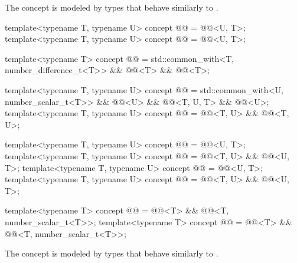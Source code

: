 \begin{itemdescr}
\pnum
\begin{note}
The  concept is modeled by types
that behave similarly to .
\end{note}
\end{itemdescr}

\begin{itemdecl}
template<typename T, typename U>
concept @@ = @@<U, T>;
template<typename T, typename U>
concept @@ = @@<U, T>;

template<typename T>
concept @@ =
  std::common_with<T, number_difference_t<T>> && @@<T> && @@<T>;

template<typename T, typename U>
concept @@ = std::common_with<U, number_scalar_t<T>> && @@<U> &&
                      @@<T, U, T> && @@<U>;
template<typename T, typename U>
concept @@ = @@<T, U> && @@<T, U>;

template<typename T, typename U>
concept @@ = @@<U, T>;
template<typename T, typename U>
concept @@ = @@<T, U> && @@<U, T>;
template<typename T, typename U>
concept @@ = @@<U, T>;
template<typename T, typename U>
concept @@ = @@<T, U> && @@<U, T>;

template<typename T>
concept @@ = @@<T> && @@<T, number_scalar_t<T>>;
template<typename T>
concept @@ = @@<T> && @@<T, number_scalar_t<T>>;
\end{itemdecl}

\begin{itemdescr}
\pnum
\begin{note}
The  concept is modeled by types
that behave similarly to .
\end{note}
\end{itemdescr}

